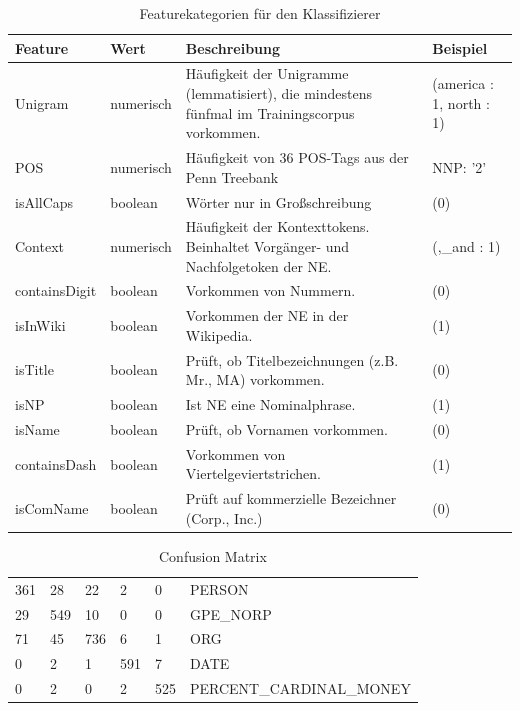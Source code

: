 \documentclass[bibliography=totoc]{scrartcl}
\begin{document}
\begin{appendices}
	\begin{table}[H]
		\centering
		\caption{Featurekategorien für den Klassifizierer}
		\begin{tabularx}{\textwidth}{llXl}
			\toprule
			Feature & Wert & Beschreibung & Beispiel\\
			\midrule
			Unigram & numerisch & Häufigkeit der Unigramme (lemmatisiert), die mindestens fünfmal im Trainingscorpus vorkommen. \cite{Mayfield2003} & (america : 1, north : 1)\\
			POS & numerisch  & Häufigkeit von 36 POS-Tags aus der Penn Treebank \cite{Chieu2003}  & NNP: '2'\\
			isAllCaps & boolean & Wörter nur in Großschreibung \cite{Nadeau2006} & (0)\\
			Context & numerisch & Häufigkeit der Kontexttokens. Beinhaltet Vorgänger- und Nachfolgetoken der NE. \cite{Munro2003}  & (,\_and : 1)\\
			containsDigit & boolean & Vorkommen von Nummern. & (0)\textit{}\\
			isInWiki & boolean & Vorkommen der NE in der Wikipedia. \cite{Toral2006} & (1)\\
			isTitle & boolean & Prüft, ob Titelbezeichnungen (z.B. Mr., MA) vorkommen. \cite{Ratinov2009} & (0)\\
			isNP & boolean & Ist NE eine Nominalphrase. \cite{Marrero2009} & (1)\\
			isName & boolean & Prüft, ob Vornamen vorkommen.\cite{Ratinov2009} & (0)\\
			containsDash & boolean & Vorkommen von Viertelgeviertstrichen. \cite{Mayfield2003} & (1) \\
			isComName & boolean & Prüft auf kommerzielle Bezeichner (Corp., Inc.) & (0)\\
			\bottomrule
		\end{tabularx}
		\label{tab:featureset}
	\end{table}

			
	\begin{table}[H]
		\caption{Confusion Matrix}
		\begin{tabularx}{\textwidth}{llllll}
			\toprule
			361 & 28 & 22 & 2 & 0 & PERSON\\
			29 & 549 & 10 & 0 & 0 & GPE\_NORP\\
			71 & 45 & 736 & 6 & 1 & ORG\\
			0 & 2 & 1 & 591 & 7 & DATE\\
			0 & 2 & 0 & 2 & 525 & PERCENT\_CARDINAL\_MONEY\\
			\bottomrule
		\end{tabularx}
		\label{tab:confusion}
	\end{table}		
	

\end{appendices}
\end{document}
